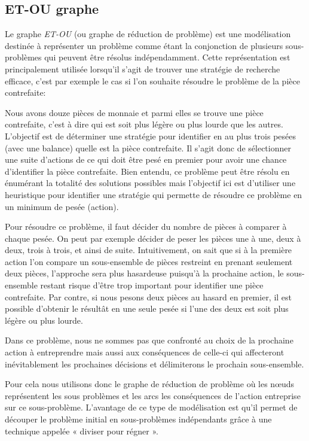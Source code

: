 \subsection{ET-OU graphe}
Le graphe \textit{ET-OU} (ou graphe de réduction de problème) est une modélisation destinée à représenter un problème comme étant la conjonction de plusieurs sous-problèmes qui peuvent être résolus indépendamment.
Cette représentation est principalement utilisée lorsqu'il s'agit de trouver une stratégie de recherche efficace, c'est par exemple le cas si l'on souhaite résoudre le problème de la pièce contrefaite:

Nous avons douze pièces de monnaie et parmi elles se trouve une pièce contrefaite, c'est à dire qui est soit plus légère ou plus lourde que les autres. L'objectif est de déterminer une stratégie pour identifier en au plus trois pesées (avec une balance) quelle est la pièce contrefaite. Il s'agit donc de sélectionner une suite d'actions de ce qui doit être pesé en premier pour avoir une chance d'identifier la pièce contrefaite.
Bien entendu, ce problème peut être résolu en énumérant la totalité des solutions possibles mais l'objectif ici est d'utiliser une heuristique pour identifier une stratégie qui permette de résoudre ce problème en un minimum de pesée (action).

Pour résoudre ce problème, il faut décider du nombre de pièces à comparer à chaque pesée. On peut par exemple décider de peser les pièces une à une, deux à deux, trois à trois, et ainsi de suite. Intuitivement, on sait que si à la première action l'on compare un sous-ensemble de pièces restreint en prenant seulement deux pièces, l'approche sera plus hasardeuse puisqu'à la prochaine action, le sous-ensemble restant risque d'être trop important pour identifier une pièce contrefaite. 
Par contre, si nous pesons deux pièces au hasard en premier, il est possible d'obtenir le résultât en une seule pesée si l'une des deux est soit plus légère ou plus lourde.

Dans ce problème, nous ne sommes pas que confronté au choix de la prochaine action à entreprendre mais aussi aux conséquences de celle-ci qui affecteront inévitablement les prochaines décisions et délimiterons le prochain sous-ensemble.

Pour cela nous utilisons donc le graphe de réduction de problème où les nœuds représentent les sous problèmes et les arcs les conséquences de l'action entreprise sur ce sous-problème. L'avantage de ce type de modélisation est qu'il permet de découper le problème initial en sous-problèmes indépendants grâce à une technique appelée « diviser pour régner ».\\

